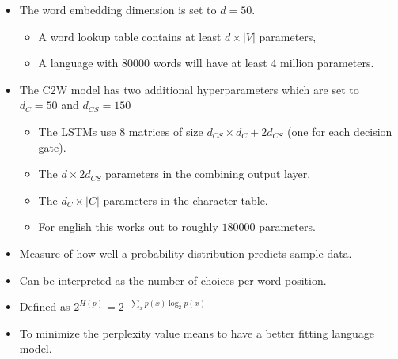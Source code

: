 \documentclass[11pt, a4paper, landscape]{article}
\begin{document}
\vfill
\begin{itemize}
\item The word embedding dimension is set to $d = 50$.
  \begin{itemize}
  \item A word lookup table contains at least $d \times |V|$ parameters, 
  \item A language with $80000$ words will have at least 4 million parameters. 
  \end{itemize}
\item The C2W model has two additional hyperparameters which are set to $d_C = 50$ and $d_{CS} = 150$
\begin{itemize}
  \item The LSTMs use 8 matrices of size $d_{CS} \times d_C + 2 d_{CS}$ (one for each decision gate).
  \item The $d \times 2d_{CS}$ parameters in the combining output layer.
  \item The $d_C \times |C|$ parameters in the character table.
  \item For english this works out to roughly $180000$ parameters.
\end{itemize}
\end{itemize}
\vfill

\NewPage{}

\vfill
\begin{itemize}
\item Measure of how well a probability distribution predicts sample data.
\item Can be interpreted as the number of choices per word position.
\item Defined as $2^{H(p)}=2^{-\sum_x p(x)\log_2 p(x)}$
\item To minimize the perplexity value means to have a better fitting language model.
\end{itemize}
\vfill

\NewPage{}
\end{document}
